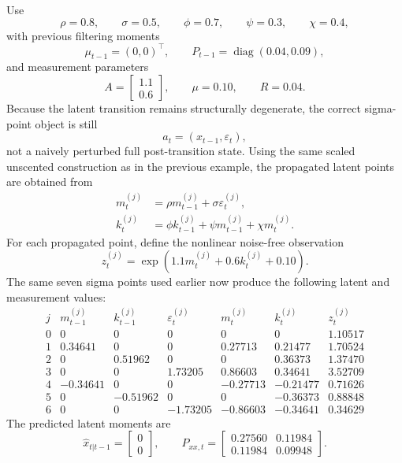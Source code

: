Use
\[
  \rho = 0.8,
  \qquad
  \sigma = 0.5,
  \qquad
  \phi = 0.7,
  \qquad
  \psi = 0.3,
  \qquad
  \chi = 0.4,
\]
with previous filtering moments
\begin{equation}
  \mu_{t-1}=(0,0)^\top,
  \qquad
  P_{t-1}=\operatorname{diag}(0.04,0.09),
\end{equation}
and measurement parameters
\[
  A=
  \begin{bmatrix}
    1.1\\ 0.6
  \end{bmatrix},
  \qquad
  \mu = 0.10,
  \qquad
  R = 0.04.
\]
Because the latent transition remains structurally degenerate, the correct
sigma-point object is still
\[
  a_t=(x_{t-1},\varepsilon_t),
\]
not a naively perturbed full post-transition state.  Using the same scaled
unscented construction as in the previous example, the propagated latent points
are obtained from
\begin{align}
  m_t^{(j)} &= \rho m_{t-1}^{(j)} + \sigma\varepsilon_t^{(j)},\\
  k_t^{(j)} &= \phi k_{t-1}^{(j)} + \psi m_{t-1}^{(j)} + \chi m_t^{(j)}.
\end{align}
For each propagated point, define the nonlinear noise-free observation
\[
  z_t^{(j)} = \exp\!\left(1.1 m_t^{(j)} + 0.6 k_t^{(j)} + 0.10\right).
\]
The same seven sigma points used earlier now produce the following latent and
measurement values:
\[
\begin{array}{c|rrr|rrr}
  j
  & m_{t-1}^{(j)} & k_{t-1}^{(j)} & \varepsilon_t^{(j)}
  & m_t^{(j)} & k_t^{(j)} & z_t^{(j)}\\
  \hline
  0 & 0 & 0 & 0 & 0 & 0 & 1.10517\\
  1 & 0.34641 & 0 & 0 & 0.27713 & 0.21477 & 1.70524\\
  2 & 0 & 0.51962 & 0 & 0 & 0.36373 & 1.37470\\
  3 & 0 & 0 & 1.73205 & 0.86603 & 0.34641 & 3.52709\\
  4 & -0.34641 & 0 & 0 & -0.27713 & -0.21477 & 0.71626\\
  5 & 0 & -0.51962 & 0 & 0 & -0.36373 & 0.88848\\
  6 & 0 & 0 & -1.73205 & -0.86603 & -0.34641 & 0.34629
\end{array}
\]
The predicted latent moments are
\[
  \hat x_{t|t-1}
  =
  \begin{bmatrix}
    0\\ 0
  \end{bmatrix},
  \qquad
  P_{xx,t}
  =
  \begin{bmatrix}
    0.27560 & 0.11984\\
    0.11984 & 0.09948
  \end{bmatrix}.
\]
